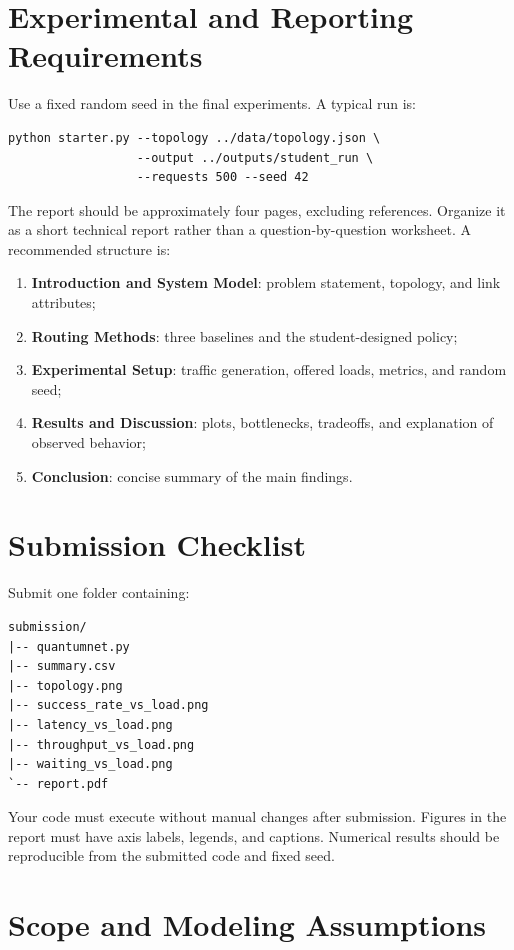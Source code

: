 \documentclass[11pt]{article}
\begin{document}
\section{Experimental and Reporting Requirements}

Use a fixed random seed in the final experiments. A typical run is:
\begin{lstlisting}
python starter.py --topology ../data/topology.json \
                  --output ../outputs/student_run \
                  --requests 500 --seed 42
\end{lstlisting}

The report should be approximately four pages, excluding references. Organize it as a short technical report rather than a question-by-question worksheet. A recommended structure is:
\begin{enumerate}
    \item \textbf{Introduction and System Model}: problem statement, topology, and link attributes;
    \item \textbf{Routing Methods}: three baselines and the student-designed policy;
    \item \textbf{Experimental Setup}: traffic generation, offered loads, metrics, and random seed;
    \item \textbf{Results and Discussion}: plots, bottlenecks, tradeoffs, and explanation of observed behavior;
    \item \textbf{Conclusion}: concise summary of the main findings.
\end{enumerate}

\section{Submission Checklist}

Submit one folder containing:
\begin{lstlisting}
submission/
|-- quantumnet.py
|-- summary.csv
|-- topology.png
|-- success_rate_vs_load.png
|-- latency_vs_load.png
|-- throughput_vs_load.png
|-- waiting_vs_load.png
`-- report.pdf
\end{lstlisting}

Your code must execute without manual changes after submission. Figures in the report must have axis labels, legends, and captions. Numerical results should be reproducible from the submitted code and fixed seed.

\section{Scope and Modeling Assumptions}
\end{document}
